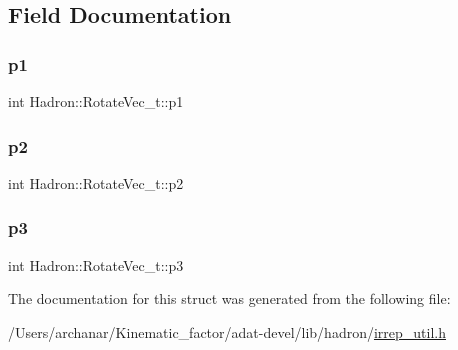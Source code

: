 \subsection{Field Documentation}
\mbox{\label{structHadron_1_1RotateVec__t_aa01fc53854938079a4599536752b6121}} 
\subsubsection{\texorpdfstring{p1}{p1}}
{\footnotesize\ttfamily int Hadron\+::\+Rotate\+Vec\+\_\+t\+::p1}

\mbox{\label{structHadron_1_1RotateVec__t_aaf71d154338bbf9c3775e8bce981febc}} 
\subsubsection{\texorpdfstring{p2}{p2}}
{\footnotesize\ttfamily int Hadron\+::\+Rotate\+Vec\+\_\+t\+::p2}

\mbox{\label{structHadron_1_1RotateVec__t_aa3170eab6d36c15ae3f4e663e064a3e7}} 
\subsubsection{\texorpdfstring{p3}{p3}}
{\footnotesize\ttfamily int Hadron\+::\+Rotate\+Vec\+\_\+t\+::p3}



The documentation for this struct was generated from the following file\+:\begin{DoxyCompactItemize}
\item 
/\+Users/archanar/\+Kinematic\+\_\+factor/adat-\/devel/lib/hadron/\mbox{\hyperlink{adat-devel_2lib_2hadron_2irrep__util_8h}{irrep\+\_\+util.\+h}}\end{DoxyCompactItemize}
